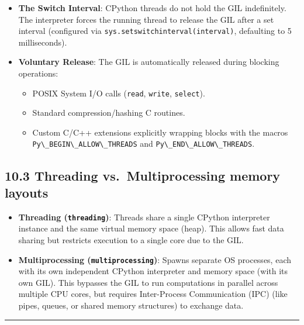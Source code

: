 \begin{itemize}
\tightlist
\item
  \textbf{The Switch Interval}: CPython threads do not hold the GIL
  indefinitely. The interpreter forces the running thread to release the
  GIL after a set interval (configured via
  \passthrough{\lstinline!sys.setswitchinterval(interval)!}, defaulting
  to 5 milliseconds).
\item
  \textbf{Voluntary Release}: The GIL is automatically released during
  blocking operations:

  \begin{itemize}
  \tightlist
  \item
    POSIX System I/O calls (\passthrough{\lstinline!read!},
    \passthrough{\lstinline!write!}, \passthrough{\lstinline!select!}).
  \item
    Standard compression/hashing C routines.
  \item
    Custom C/C++ extensions explicitly wrapping blocks with the macros
    \passthrough{\lstinline!Py\_BEGIN\_ALLOW\_THREADS!} and
    \passthrough{\lstinline!Py\_END\_ALLOW\_THREADS!}.
  \end{itemize}
\end{itemize}

\hypertarget{threading-vs.-multiprocessing-memory-layouts}{%
\subsection{10.3 Threading vs.~Multiprocessing memory
layouts}\label{threading-vs.-multiprocessing-memory-layouts}}

\begin{itemize}
\tightlist
\item
  \textbf{Threading (\passthrough{\lstinline!threading!})}: Threads
  share a single CPython interpreter instance and the same virtual
  memory space (heap). This allows fast data sharing but restricts
  execution to a single core due to the GIL.
\item
  \textbf{Multiprocessing (\passthrough{\lstinline!multiprocessing!})}:
  Spawns separate OS processes, each with its own independent CPython
  interpreter and memory space (with its own GIL). This bypasses the GIL
  to run computations in parallel across multiple CPU cores, but
  requires Inter-Process Communication (IPC) (like pipes, queues, or
  shared memory structures) to exchange data.
\end{itemize}

\begin{center}\rule{0.5\linewidth}{0.5pt}\end{center}
